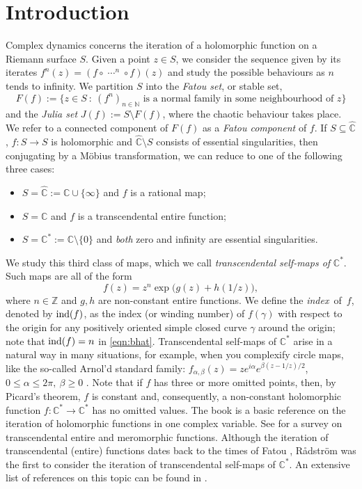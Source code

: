 \documentclass[a4paper, 12pt, reqno]{amsart}
\numberwithin{equation}{section}
\newcommand{\ds}{\displaystyle}
\theoremstyle{plain}
\theoremstyle{definition}
\theoremstyle{remark}
\newcommand{\C}{{\mathbb{C}}}
\newcommand{\CR}{{\hat{\mathbb{C}}}}
\newcommand{\CS}{{\mathbb{C}^*}}
\newcommand{\Z}{{\mathbb{Z}}}
\begin{document}
\section{Introduction}

Complex dynamics concerns the iteration of a holomorphic function on a Riemann surface $S$. Given a point $z\in S$, we consider the sequence given by its iterates $f^n(z)=(f\circ\ds\mathop{\cdots}^{n}\circ f)(z)$ and study the possible behaviours as $n$ tends to infinity. We partition $S$ into the \textit{Fatou set}, or stable set,
$$
F(f):=\bigl\{z\in S\ :\ (f^n)_{n\in\mathbb N} \mbox{ is a normal family in some neighbourhood of } z\bigr\}
$$
and the \textit{Julia set} $J(f):=S\setminus  F(f)$, where the chaotic behaviour takes place. We refer to a connected component of $F(f)$ as a \textit{Fatou component} of $f$. If $S\subseteq \CR$, $f:S\rightarrow S$ is holomorphic and $\CR\setminus S$ consists of essential singularities, then conjugating by a M\"obius transformation, we can reduce to one of the following three cases:
\begin{itemize}
\item $S=\CR:=\C\cup\{\infty\}$ and $f$ is a rational map;
\item $S=\C$ and $f$ is a transcendental entire function;
\item $S=\CS:=\C\setminus\{0\}$ and \textit{both} zero and infinity are essential singularities.
\end{itemize}
We study this third class of maps, which we call \textit{transcendental self-maps of} $\CS$. Such maps are all of the form
\begin{equation}
f(z)=z^n\exp\bigl(g(z)+h(1/z)\bigr),
\label{eqn:bhat}
\end{equation}
where $n\in\Z$ and $g,h$ are non-constant entire functions. We define the \textit{index}~of~$f$, denoted by $\textup{ind}(f)$, as the index (or winding number) of $f(\gamma)$ with respect to the origin for any positively oriented simple closed curve $\gamma$ around the origin; note that $\textup{ind}(f)=n$ in \eqref{eqn:bhat}. Transcendental self-maps of $\C^*$ arise in a natural way in many situations, for example, when you complexify circle maps, like the so-called Arnol'd standard family: $f_{\alpha,\beta}(z)=ze^{i\alpha}e^{\beta(z-1/z)/2}$, $0\leqslant \alpha\leqslant 2\pi,\ \beta\geqslant 0$ \cite{fagella99}. Note that if $f$ has three or more omitted points, then, by Picard's theorem, $f$ is constant and, consequently, a non-constant holomorphic function $f:\C^*\rightarrow \C^*$ has no omitted values. The book \cite{milnor06} is a basic reference on the iteration of holomorphic functions in one complex variable. See \cite{bergweiler93} for a survey on transcendental entire and meromorphic functions. Although the iteration of transcendental (entire) functions dates back to the times of Fatou \cite{fatou26}, R{\aa}dstr\"om \cite{radstrom53} was the first to consider the iteration of transcendental self-maps of $\C^*$. An extensive list of references on this topic can be found in \cite{martipete}.
\end{document}
